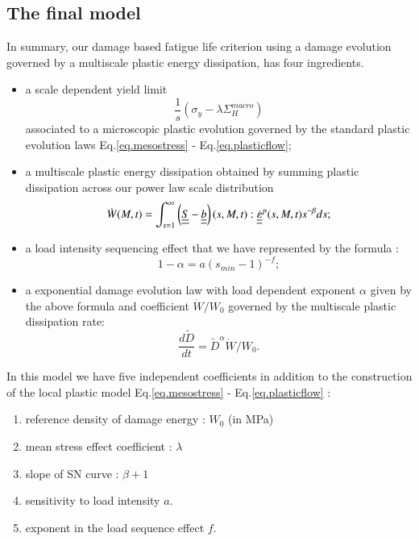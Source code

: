 \documentclass[3p,times,procedia,number]{elsarticle}
\begin{document}
\subsection{The final model}
\label{sec:5.6.3}
In summary, our damage based fatigue life criterion using a damage evolution governed by a multiscale plastic energy dissipation, has four ingredients.
\begin{itemize}
\item  a scale dependent yield limit $$\frac{1}{s} (\sigma_y- \lambda \Sigma_H^{macro})$$ associated to a microscopic plastic evolution governed by the standard plastic evolution laws Eq.\eqref{eq.mesostress} - Eq.\eqref{eq.plasticflow};

\vspace{6pt}	

\item a multiscale plastic energy dissipation obtained by summing plastic dissipation across our power law scale distribution
\begin{equation}
\dot{W}(M,t)=\int_{s=1}^{\infty}\left(\uline{\uline{S}}-\uline{\uline{b}} \right) (s,M,t):\uline{\uline{\dot{\varepsilon}}}^p(s,M,t) s^{-\beta}ds;
\label{eq.final2}
\end{equation}

\vspace{6pt}	

\item a load intensity sequencing effect that we have represented by the formula : 
\begin{equation}
1 - \alpha = a (s_{min}-1)^{-f};
\label{eq.final3}
\end{equation}

\vspace{6pt}	

\item a exponential damage evolution law with load dependent exponent $\alpha$ given by the above formula and coefficient $\dot{W}/W_0$ governed by the multiscale plastic dissipation rate: 
\begin{equation}
\dfrac{d\tilde{D}}{dt} ={\tilde{D}}^\alpha \dot{W}/W_0.
\label{eq.final4}
\end{equation}
\end{itemize}

In this model we have five independent coefficients in addition to the construction of the local plastic model Eq.\eqref{eq.mesostress} - Eq.\eqref{eq.plasticflow} :

\begin{enumerate}
\item reference density of damage energy : $W_0$ (in MPa)

\item mean stress effect coefficient : $\lambda$
\item slope of SN curve : $\beta+1$

\item sensitivity to load intensity $a$. 
\item exponent in the load sequence effect $f$. 
\end{enumerate}
\end{document}
